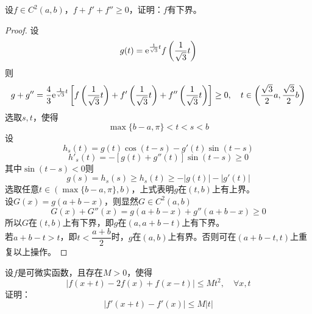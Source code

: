 \begin{proposition}
    
    设$f \in C^2(a,b)$，$f + f' + f'' \geq 0$，证明：$f$有下界。

\end{proposition}

\begin{proof}

    设
    $$g(t) = \mathrm{e}^{\frac{1}{\sqrt{3}}t}f\left( \frac{1}{\sqrt{3}}t \right)$$
    则
    $$g + g'' = \dfrac{4}{3}\mathrm{e}^{\frac{1}{\sqrt{3}}t} \left[ f\left( \dfrac{1}{\sqrt{3}}t \right) + f'\left( \frac{1}{\sqrt{3}}t \right) + f''\left( \frac{1}{\sqrt{3}}t \right) \right] \geq 0, \quad t \in \left( \dfrac{\sqrt{3}}{2}a, \dfrac{\sqrt{3}}{2}b \right)$$
    选取$s,t$，使得
    $$\max\{b - a, \pi\} < t < s < b$$
    设
    $$h_s(t) = g(t) \cos{(t - s)} - g'(t)\sin{(t - s)}$$
    $$h'_s(t) = -[g(t) + g''(t)] \sin{(t - s)} \geq 0$$
    其中$\sin{(t - s)} < 0$则
    $$g(s) = h_s(s) \geq h_s(t) \geq -|g(t)| - |g'(t)|$$
    选取任意$t \in (\max\{b - a,\pi\},b)$，上式表明$g$在$(t,b)$上有上界。\\
    设$G(x) = g(a + b - x)$，则显然$G \in C^2(a,b)$
    $$G(x) + G''(x) = g(a + b - x) + g''(a + b - x) \geq 0$$
    所以$G$在$(t,b)$上有下界，即$g$在$(a, a + b - t)$上有下界。\\
    若$a + b - t > t$，即$t < \dfrac{a + b}{2}$时，$g$在$(a,b)$上有界。否则可在$(a + b - t ,t)$上重复以上操作。

\end{proof}

\begin{proposition}

    设$f$是可微实函数，且存在$M > 0$，使得
    $$|f(x + t) - 2f(x) + f(x - t)| \leq Mt^2, \quad \forall x,t$$
    证明：
    $$|f'(x + t) - f'(x)| \leq M|t|$$

\end{proposition}

